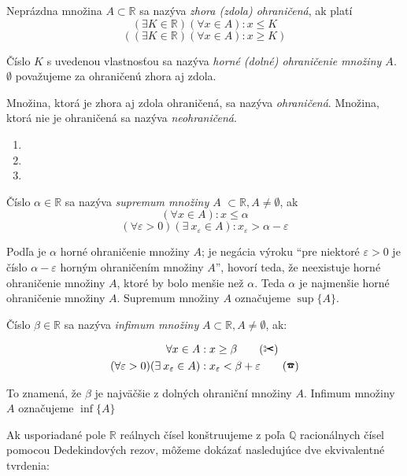 Neprázdna množina $A \subset \mathbb{R}$ sa nazýva \textit{zhora (zdola)
ohraničená}, ak platí
\[
  (\exists K \in  \mathbb{R})
    (\forall x \in A):
      x \leq K
\]
\[
  ((\exists K \in \mathbb{R})
    (\forall x \in A):
      x \geq K)
\]

Číslo $K$ s uvedenou vlastnosťou sa nazýva \textit{horné (dolné)
ohraničenie množiny $A$.} $\emptyset$ považujeme za ohraničenú zhora aj zdola.

Množina, ktorá je zhora aj zdola ohraničená, sa nazýva \textit{ohraničená}.
Množina, ktorá nie je ohraničená sa nazýva \textit{neohraničená}.

\begin{enumerate}[resume]
\item {}
\item {}
\item {}
\end{enumerate}


Číslo $\alpha \in \mathbb{R}$ sa nazýva \textit{supremum množiny $A$}
$\subset \mathbb{R}, A \neq \emptyset$, ak
\[
  (\forall x \in A): x \leq \alpha \label{eq:supremum-i}
\]
\[
  (\forall \varepsilon > 0) (\exists \: x_\varepsilon \in A):
  x_\varepsilon > \alpha - \varepsilon
\]

Podľa  je $\alpha$ horné ohraničenie množiny $A$;  je negácia
výroku ``pre niektoré $\varepsilon > 0$ je číslo $\alpha - \varepsilon$ horným
ohraničením množiny $A$'', hovorí teda, že neexistuje horné ohraničenie množiny
$A$, ktoré by bolo menšie než $\alpha$. Teda $\alpha$ je najmenšie horné
ohraničenie množiny $A$. Supremum množiny $A$ označujeme $\sup \{ A \}$.

Číslo $\beta \in \mathbb{R}$ sa nazýva \textit{infimum množiny} $A \subset
\mathbb{R}, A \neq \emptyset$, ak:

\begin{align*}
\forall x \in A&: x \geq \beta \tag{\ding{34}} \\
(\forall \varepsilon > 0) (\exists \: x_\varepsilon \in A)&:
x_\varepsilon < \beta + \varepsilon \tag{\ding{37}}
\end{align*}

To znamená, že $\beta$ je najväčšie z dolných ohraniční množiny $A$. Infimum
množiny $A$ označujeme $\inf\{A\}$

Ak usporiadané pole $\mathbb{R}$ reálnych čísel konštruujeme z poľa
$\mathbb{Q}$ racionálnych čísel pomocou Dedekindových rezov, môžeme dokázať
nasledujúce dve ekvivalentné tvrdenia:

